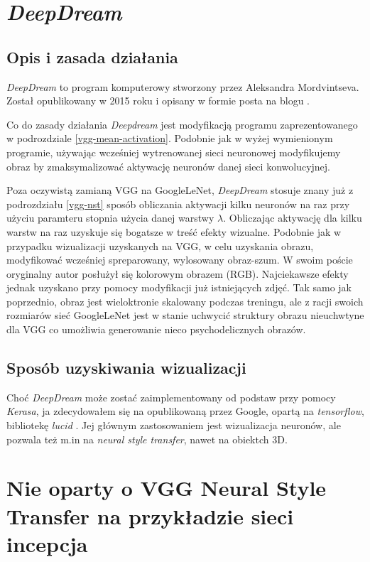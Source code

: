 \section{\textit{DeepDream}}

\subsection{Opis i zasada działania}

\textit{DeepDream} to  program komputerowy stworzony przez Aleksandra Mordvintseva. Został opublikowany  w 2015 roku i opisany w formie posta na blogu \cite{deepdream}.

Co do zasady działania \textit{Deepdream} jest modyfikacją programu zaprezentowanego w podrozdziale \ref{vgg-mean-activation}. Podobnie jak w wyżej wymienionym programie, używając wcześniej wytrenowanej sieci neuronowej modyfikujemy obraz by zmaksymalizować aktywację neuronów danej sieci konwolucyjnej.

Poza oczywistą zamianą VGG na GoogleLeNet, \textit{DeepDream} stosuje znany już z podrozdziału
\ref{vgg-nst} sposób obliczania aktywacji kilku neuronów na raz przy użyciu paramteru stopnia 
użycia danej warstwy \(\lambda\). Obliczając aktywację dla kilku warstw na raz uzyskuje się bogatsze w treść efekty wizualne. Podobnie jak w przypadku wizualizacji uzyskanych na VGG, w celu uzyskania obrazu,
modyfikować wcześniej spreparowany, wylosowany obraz-szum. W swoim poście oryginalny autor posłużył się kolorowym obrazem (RGB). Najciekawsze efekty jednak uzyskano przy pomocy modyfikacji już istniejących zdjęć. Tak samo jak poprzednio, obraz jest wieloktronie skalowany podczas treningu, ale z racji swoich rozmiarów sieć GoogleLeNet jest w stanie uchwycić struktury obrazu nieuchwtyne dla VGG co umożliwia generowanie 
nieco psychodelicznych obrazów.

\subsection{Sposób uzyskiwania wizualizacji}
Choć \textit{DeepDream} może zostać zaimplementowany od podstaw przy pomocy \textit{Kerasa}, ja zdecydowałem się na  
opublikowaną przez Google, opartą na \textit{tensorflow}, bibliotekę \textit{lucid} \cite{lucidrepo}. Jej głównym zastosowaniem jest wizualizacja neuronów, ale pozwala też m.in na \textit{neural style transfer}, nawet na obiektch 3D.

\section{Nie oparty o VGG Neural Style Transfer na przykładzie sieci incepcja}
